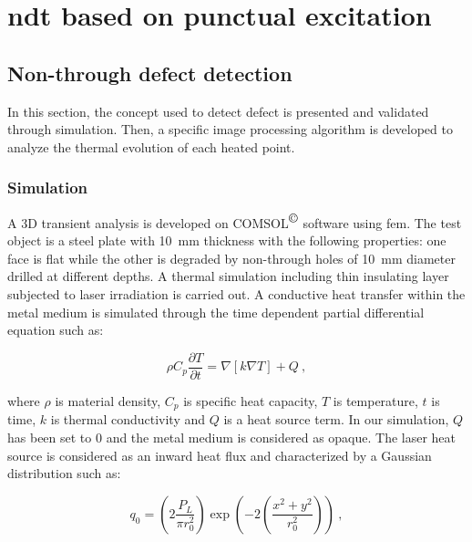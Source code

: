 
\section{\acl{ndt} based on punctual excitation}\label{sec:3}

\subsection{Non-through defect detection}\label{subsec:31}

In this section, the concept used to detect defect is presented and validated through simulation. Then, a specific image processing algorithm is developed to analyze the thermal evolution of each heated point. 

\subsubsection{Simulation}\label{subsec:311}

A 3D transient analysis is developed on COMSOL\textsuperscript{$\copyright$} software using \ac{fem}. The test object is a steel plate with \SI{10}{\milli \metre} thickness with the following properties: one face is flat while the other is degraded by non-through holes of \SI{10}{\milli \metre} diameter drilled at different depths. A thermal simulation including thin insulating layer subjected to laser irradiation is carried out. 
A conductive heat transfer within the metal medium is simulated through the time dependent partial differential equation such as:

\begin{equation}
  \label{eq:1}
  \rho C_p \frac{\partial T}{\partial t} = \nabla \left[ k \nabla T  \right] + Q \ ,
\end{equation}

\noindent where $\rho$ is material density, $C_p$ is specific heat capacity, $T$ is temperature, $t$ is time, $k$ is thermal conductivity and $Q$ is a heat source term.
In our simulation, $Q$ has been set to $0$ and the metal medium is considered as opaque. The laser heat source is considered as an inward heat flux and characterized by a Gaussian distribution such as:

\begin{equation}
  \label{eq:2}
  q_0 = \left( 2 \frac{P_L}{\pi r_{0}^{2}} \right) \exp \left( -2 \left( \frac{x^2 + y^2}{r_{0}^{2}} \right) \right) \ ,
\end{equation}


